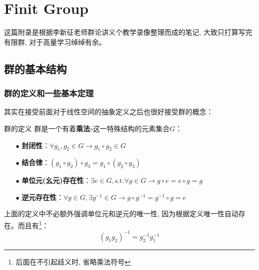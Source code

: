 
\chapter{Finit Group}
这篇附录是根据李新征老师群论讲义个教学录像整理而成的笔记, 大致只打算写完有限群, 对于高量学习绰绰有余。
\section{群的基本结构}
\subsection{群的定义和一些基本定理}
其实在接受前面对于线性空间的抽象定义之后也很好接受群的概念：
\begin{define}{群的定义}
    群是一个有着\textbf{乘法}$\circ$这一特殊结构的元素集合$G$：
    \begin{itemize}
    \item[$\bullet$] \textbf{封闭性}：$\forall g_1,g_2\in G\rightarrow g_1\circ g_2\in G$
    \item[$\bullet$] \textbf{结合律}：$(g_1\circ g_2)\circ g_3=g_1\circ (g_2\circ g_3)$
    \item[$\bullet$] \textbf{单位元(幺元)存在性}：$\exists e\in G,\mathrm{s.t.}\forall g\in G\rightarrow g\circ e=e\circ g=g$
    \item[$\bullet$] \textbf{逆元存在性}：$\forall g\in G,\exists g^{-1}\in G\rightarrow g\circ g^{-1}=g^{-1}\circ g=e$
    \end{itemize}
\end{define}
上面的定义中不必额外强调单位元和逆元的唯一性, 因为根据定义唯一性自动存在。而且有\footnote{后面在不引起歧义时, 省略乘法符号}：
\begin{equation*}
    (g_1g_2)^{-1}=g_2^{-1}g_1^{-1}
\end{equation*}

